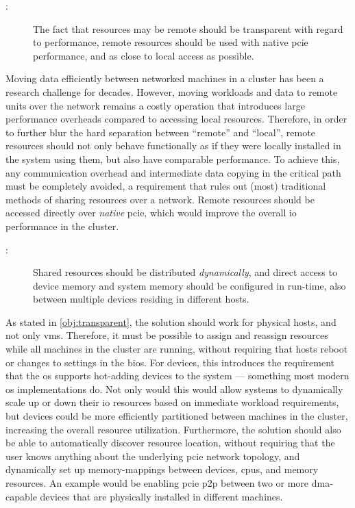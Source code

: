 \begin{description}    
    \item[:] The fact that resources may be remote should be transparent with regard to performance, remote resources should be used with native \gls{pcie} performance, and as close to local access as possible.
\end{description}
Moving data efficiently between networked machines in a cluster has been a research challenge for decades. However, moving workloads and data to remote units over the network remains a costly operation that introduces large performance overheads compared to accessing local resources. 
Therefore, in order to further blur the hard separation between ``remote'' and ``local'', remote resources should not only behave functionally as if they were locally installed in the system using them, but also have comparable performance.
To achieve this, any communication overhead and intermediate data copying in the critical path must be completely avoided, a requirement that rules out (most) traditional methods of sharing resources over a network. 
Remote resources should be accessed directly over \emph{native} \gls{pcie}, which would improve the overall \gls{io} performance in the cluster.

\begin{description}    
    \item[:] Shared resources should be distributed \emph{dynamically}, and direct access to device memory and system memory should be configured in run-time, also between multiple devices residing in different hosts.
\end{description}
As stated in \cref{obj:transparent}, the solution should work for physical hosts, and not only \glspl{vm}. Therefore, it must be possible to assign and reassign resources while all machines in the cluster are running, without requiring that hosts reboot or changes to settings in the \gls{bios}.
For devices, this introduces the requirement that the \gls{os} supports hot-adding devices to the system --- something most modern \gls{os} implementations do.
Not only would this would allow systems to dynamically scale up or down their \gls{io} resources based on immediate workload requirements, but devices could be more efficiently partitioned between machines in the cluster, increasing the overall resource utilization. 
Furthermore, the solution should also be able to automatically discover resource location, without requiring that the user knows anything about the underlying \gls{pcie} network topology, and dynamically set up memory-mappings between devices, \glspl{cpu}, and memory resources. An example would be enabling \gls{pcie} \gls{p2p} between two or more \gls{dma}-capable devices that are physically installed in different machines.

